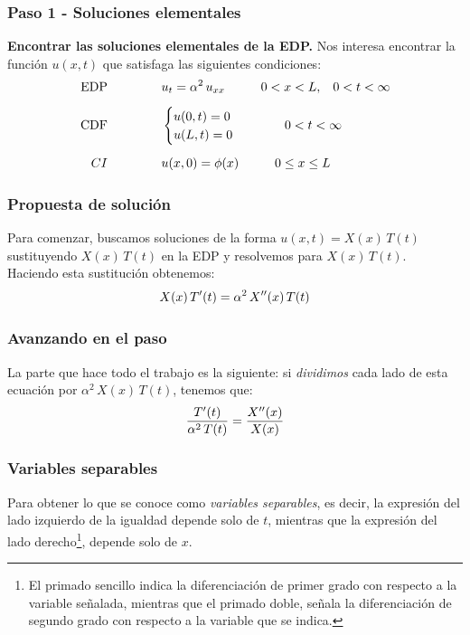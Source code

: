 \documentclass[12pt]{beamer}
\begin{document}
\begin{frame}
\frametitle{Paso 1 - Soluciones elementales}
\textbf{Encontrar las soluciones elementales de la EDP.}
\pause
Nos interesa encontrar la función $u(x, t)$ que satisfaga las siguientes condiciones:
\begin{align*}
\mbox{EDP} \hspace{1.5cm} &u_{t} = \alpha^{2} \, u_{xx} \hspace{1cm} 0 < x < L, \hspace{0.3cm} 0 < t < \infty \\[0.5em] 
\mbox{CDF} \hspace{1.5cm} &\begin{cases}
    u(0, t) = 0 \\
    u(L, t) = 0
    \end{cases}
    \hspace{1cm}
    0 < t < \infty \\[0.5em]
CI \hspace{1.5cm} & u(x, 0) = \phi (x) \hspace{1cm} 0 \leq x \leq L
\end{align*}
\end{frame}
\begin{frame}
\frametitle{Propuesta de solución}
Para comenzar, buscamos soluciones de la forma $u (x, t) = X(x) \, T (t)$ sustituyendo $X (x) \, T (t)$ en la EDP y resolvemos para  $X (x) \, T (t)$.
\\
\bigskip
\pause
Haciendo esta sustitución obtenemos:
\begin{align*}
X(x) \, {T}^{\prime} (t) = \alpha^{2} \, {X}^{\prime \prime} (x) \, T(t)
\end{align*}
\end{frame}
\begin{frame}
\frametitle{Avanzando en el paso}
La parte que hace todo el trabajo es la siguiente: si \emph{dividimos} cada lado de esta ecuación por $\alpha^{2} \, X(x) \, T(t)$, tenemos que:
\pause
\begin{align*}
\dfrac{{T}^{\prime} (t)}{\alpha^{2} \, T(t)} = \dfrac{{X}^{\prime \prime} (x)}{X(x)}
\end{align*}
\end{frame}
\begin{frame}
\frametitle{Variables separables}
Para obtener lo que se conoce como \emph{variables separables}, es decir, la expresión del lado izquierdo de la igualdad depende solo de $t$, mientras que la expresión del lado derecho\footnote{El primado sencillo indica la diferenciación de primer grado con respecto a la variable señalada, mientras que el primado doble, señala la diferenciación de segundo grado con respecto a la variable que se indica.}, depende solo de $x$.
\end{frame}
\end{document}
